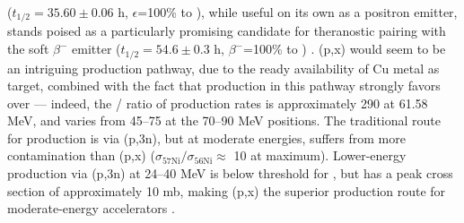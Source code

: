 \documentclass[%
 reprint,
superscriptaddress,
onecolumn,
linenumbers,
notitlepage,
 amsmath,amssymb,
 aps,
prc,
]{revtex4-1}
\begin{document}
 ($t_{1/2}=35.60\pm0.06$ h, $\epsilon$=100\% to  \cite{Bhat1998}), while useful on its own as a positron emitter, stands poised as a particularly promising candidate for theranostic pairing with the soft $\beta^-$ emitter  ($t_{1/2}=54.6\pm0.3$ h, $\beta^-$=100\% to  \cite{Browne2010a}) \cite{PMID:7632762,zweit1996medium,Graves2016,Rosch2014}. 
(p,x) would seem to be an intriguing production pathway, due to the ready availability of Cu metal as target, combined with the fact that production in this pathway strongly favors  over  --- indeed, the / 
ratio of production rates is approximately 290 at 61.58 MeV, and varies from 45--75 at the 70--90 MeV positions.
The traditional route for  production is via (p,3n), but at moderate energies, suffers from more   contamination than (p,x)  ($\sigma_\text{57Ni} / \sigma_\text{56Ni}\approx$ 10 at maximum).
Lower-energy production via (p,3n) at 24--40 MeV is below threshold for , but has a peak cross section of approximately 10 mb, making (p,x) the superior production route for moderate-energy accelerators  \cite{MICHEL1997153,Ditrói2013}.
\end{document}
